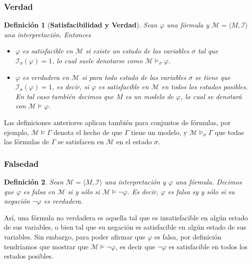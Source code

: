 \documentclass[letterpaper,12pt]{article}
\newtheorem{define}{Definición}[]
\begin{document}
    \subsubsection{Verdad}
    \begin{define}[\textbf{Satisfacibilidad y Verdad}]
      Sean $\varphi$ una fórmula y 
      $\mathcal{M} = \langle M, \mathcal{I} \rangle$ una interpretación. 
      Entonces
      \begin{itemize}
        \item $\varphi$ es satisfacible en $\mathcal{M}$ si existe un estado de 
        las variables $\sigma$ tal que $\mathcal{I}_{\sigma}(\varphi) = 1$, lo 
        cual suele denotarse como $\mathcal{M} \models_{\sigma} \varphi$.
        \item $\varphi$ es verdadera en $\mathcal{M}$ si para todo estado de
        las variables $\sigma$ se tiene que $\mathcal{I}_{\sigma}(\varphi) = 1$,
        es decir, si $\varphi$ es satisfacible en $\mathcal{M}$ en todos los 
        estados posibles.
        En tal caso también decimos que $M$ es un modelo de $\varphi$, lo cual 
        se denotará con $\mathcal{M} \models \varphi$.
      \end{itemize}
    \end{define}

    Las definiciones anteriores  aplican también para conjuntos de fórmulas, 
    por ejemplo, $\mathcal{M} \models \Gamma$ denota el hecho de que $\Gamma$
    tiene un modelo, y $\mathcal{M} \models_{\sigma} \Gamma$ que todas las fórmulas 
    de $\Gamma$ se satisfacen en $\mathcal{M}$ en el estado $\sigma$.

    \subsubsection{Falsedad}
    \begin{define}
      Sean $\mathcal{M} = \langle M, \mathcal{I} \rangle$ una interpretación y
      $\varphi$ una fórmula. Decimos que $\varphi$ es falsa en $\mathcal{M}$ si
      y sólo si $\mathcal{M} \models \neg \varphi$. Es decir, $\varphi$ es 
      falsa sy y sólo si su negación $\neg \varphi$ es verdadera.
    \end{define}

    Así, una fórmula no verdadera es aquella tal que es insatisfacible en 
    algún estado de sus variables, o bien tal que su negación es 
    satisfacible en algún estado de sus variables. Sin embargo, para poder 
    afirmar que $\varphi$ es falsa, por definición tendríamos que mostrar
    que $\mathcal{M} \models \neg \varphi$, es decir que $\neg \varphi$ es 
    satisfacible en todos los estados posibles.
\end{document}

